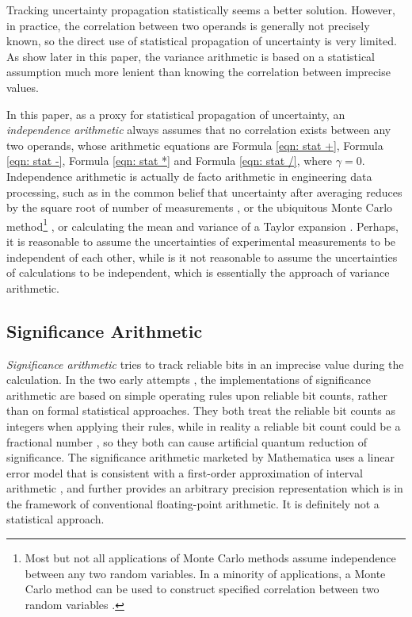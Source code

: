 \documentclass[twoside]{article}
\numberwithin{equation}{section}
\begin{document}
Tracking uncertainty propagation statistically seems a better solution.  
However, in practice, the correlation between two operands is generally not precisely known, so the direct use of statistical propagation of uncertainty is very limited.  
As show later in this paper, the variance arithmetic is based on a statistical assumption much more lenient than knowing the correlation between imprecise values.

In this paper, as a proxy for statistical propagation of uncertainty, an \emph{independence arithmetic} always assumes that no correlation exists between any two operands, whose arithmetic equations are Formula \eqref{eqn: stat +}, Formula \eqref{eqn: stat -}, Formula \eqref{eqn: stat *} and Formula \eqref{eqn: stat /}, where $\gamma=0$.  
Independence arithmetic is actually de facto arithmetic in engineering data processing, such as in the common belief that uncertainty after averaging reduces by the square root of number of measurements \cite{Statistical_Methods}\cite{Precisions_Physical_Measurements}, or the ubiquitous Monte Carlo method\footnote{Most but not all applications of Monte Carlo methods assume independence between any two random variables.  
In a minority of applications, a Monte Carlo method can be used to construct specified correlation between two random variables \cite{Monte_Carlo_Statistics}.} \cite{Monte_Carlo_Method}\cite{Monte_Carlo_Statistics}, or calculating the mean and variance of a Taylor expansion \cite{Taylor_Expansion_Uncertainty}.  
Perhaps, it is reasonable to assume the uncertainties of experimental measurements to be independent of each other, while is it not reasonable to assume the uncertainties of calculations to be independent, which is essentially the approach of variance arithmetic.


\subsection{Significance Arithmetic}

\emph{Significance arithmetic} \cite{Significance_Arithmetic} tries to track reliable bits in an imprecise value during the calculation.  
In the two early attempts \cite{Digital_Significance_Arithmetic}\cite{Unnormalized_Arithmetic}, the implementations of significance arithmetic are based on simple operating rules upon reliable bit counts, rather than on formal statistical approaches.  
They both treat the reliable bit counts as integers when applying their rules, while in reality a reliable bit count could be a fractional number \cite{Mathematica_Significance_Arithmetic}, so they both can cause artificial quantum reduction of significance.  
The significance arithmetic marketed by Mathematica \cite{Mathematica_Significance_Arithmetic} uses a linear error model that is consistent with a first-order approximation of interval arithmetic \cite{Precise_Numerical_Methods}\cite{Interval_Analysis_Theory_Applications}\cite{Interval_Arithmetic}, and further provides an arbitrary precision representation which is in the framework of  conventional floating-point arithmetic. 
It is definitely not a statistical approach. 
\end{document}
